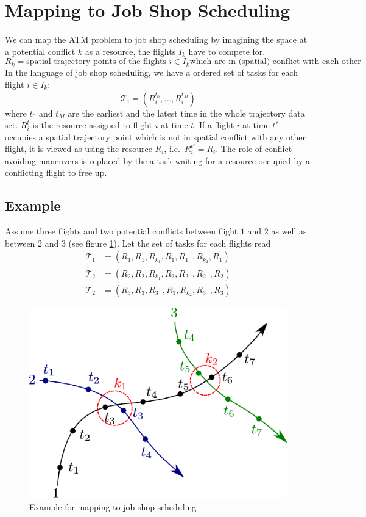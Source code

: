 \documentclass{article}
\begin{document}
\section{Mapping to Job Shop Scheduling}
We can map the ATM problem to job shop scheduling by imagining the space at a potential conflict $k$ as a resource, the flights $I_k$ have to compete for.
\begin{equation*}
    R_k = \text{spatial trajectory points of the flights } i \in I_k \text{which are in (spatial) conflict with each other}
\end{equation*}
In the language of job shop scheduling, we have a ordered set of tasks for each flight $i \in I_k$:
\begin{equation*}
    \mathcal{T}_i = \left(R^{t_0}_i, \dots, R^{t_M}_i\right)
\end{equation*}
where $t_0$ and $t_M$ are the earliest and the latest time in the whole trajectory data set.
$R^t_i$ is the resource assigned to flight $i$ at time $t$.
If a flight $i$ at time $t'$ occupies a spatial trajectory point which is not in spatial conflict with any other flight, it is viewed as using the resource $R_i$, i.e.\ $R^{t'}_i = R_i$.
The role of conflict avoiding maneuvers is replaced by the a task waiting for a resource occupied by a conflicting flight to free up.
\subsection{Example}
Assume three flights and two potential conflicts between flight $1$ and $2$ as well as between $2$ and $3$ (see figure \ref{fig:jobshop_example}).
Let the set of tasks for each flights read
\begin{align*}
    \mathcal{T}_1 &= \left(R_1, R_1, R_{k_1}, R_1, R_1\;\,, R_{k_2}, R_1\right) \\
    \mathcal{T}_2 &= \left(R_2, R_2, R_{k_1}, R_2, R_2\;\,, R_2\;\,, R_2 \right) \\
    \mathcal{T}_2 &= \left(R_3, R_3, R_3\;\,, R_3, R_{k_2}, R_3\;\,, R_3 \right) 
\end{align*}

\begin{figure}[htpb]
    \centering
    \includegraphics[width=0.6\linewidth]{pics/jobshop_example}
    \caption{Example for mapping to job shop scheduling}
    \label{fig:jobshop_example}
\end{figure}
\end{document}
